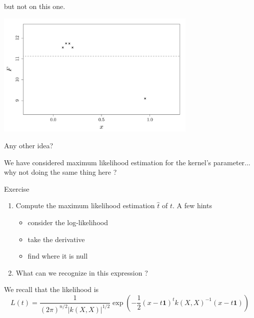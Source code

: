 \documentclass{beamer}
\begin{document}
\begin{frame}{}
but not on this one.
\begin{center}
	\includegraphics[height=6cm]{figures/R/trend_pbbasicordinary}
\end{center}
Any other idea?
\end{frame}

\begin{frame}{}
We have considered maximum likelihood estimation for the kernel's parameter... why not doing the same thing here ?
\begin{exampleblock}{Exercise}
\begin{enumerate}
	\item Compute the maximum likelihood estimation $\hat{t}$ of $t$. A few hints
	\begin{itemize}
		\item consider the log-likelihood
		\item take the derivative
		\item find where it is null
	\end{itemize}
	\item What can we recognize in this expression ?
\end{enumerate}
We recall that the likelihood is
\begin{equation*}
L(t) = \frac{1}{\displaystyle (2 \pi)^{n/2} |k(X,X)|^{1/2}} \exp \left(-\frac12 (x-t \mathbf{1})^t k(X,X)^{-1} (x-t \mathbf{1})  \right)
\end{equation*}
\end{exampleblock}
\end{frame}
\end{document}
